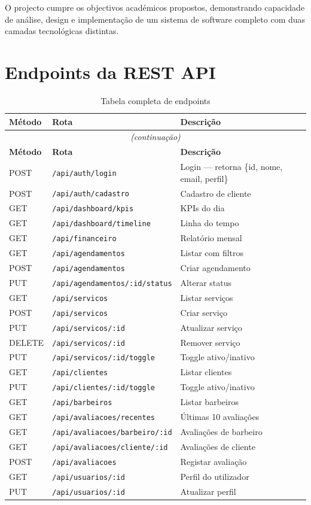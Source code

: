 \documentclass[12pt,a4paper]{article}
\begin{document}
O projecto cumpre os objectivos académicos propostos, demonstrando capacidade de análise, design e implementação de um sistema de software completo com duas camadas tecnológicas distintas.

\newpage
\appendix
\section{Endpoints da REST API}

\begin{longtable}{@{}llp{5.5cm}@{}}
\caption{Tabela completa de endpoints} \\
\toprule
\textbf{Método} & \textbf{Rota} & \textbf{Descrição} \\
\midrule
\endfirsthead
\multicolumn{3}{c}{\textit{(continuação)}} \\
\toprule
\textbf{Método} & \textbf{Rota} & \textbf{Descrição} \\
\midrule
\endhead
\bottomrule
\endfoot
POST & \texttt{/api/auth/login} & Login — retorna \{id, nome, email, perfil\} \\
POST & \texttt{/api/auth/cadastro} & Cadastro de cliente \\
GET  & \texttt{/api/dashboard/kpis} & KPIs do dia \\
GET  & \texttt{/api/dashboard/timeline} & Linha do tempo \\
GET  & \texttt{/api/financeiro} & Relatório mensal \\
GET  & \texttt{/api/agendamentos} & Listar com filtros \\
POST & \texttt{/api/agendamentos} & Criar agendamento \\
PUT  & \texttt{/api/agendamentos/:id/status} & Alterar status \\
GET  & \texttt{/api/servicos} & Listar serviços \\
POST & \texttt{/api/servicos} & Criar serviço \\
PUT  & \texttt{/api/servicos/:id} & Atualizar serviço \\
DELETE & \texttt{/api/servicos/:id} & Remover serviço \\
PUT  & \texttt{/api/servicos/:id/toggle} & Toggle ativo/inativo \\
GET  & \texttt{/api/clientes} & Listar clientes \\
PUT  & \texttt{/api/clientes/:id/toggle} & Toggle ativo/inativo \\
GET  & \texttt{/api/barbeiros} & Listar barbeiros \\
GET  & \texttt{/api/avaliacoes/recentes} & Últimas 10 avaliações \\
GET  & \texttt{/api/avaliacoes/barbeiro/:id} & Avaliações de barbeiro \\
GET  & \texttt{/api/avaliacoes/cliente/:id} & Avaliações de cliente \\
POST & \texttt{/api/avaliacoes} & Registar avaliação \\
GET  & \texttt{/api/usuarios/:id} & Perfil do utilizador \\
PUT  & \texttt{/api/usuarios/:id} & Atualizar perfil \\
\end{longtable}
\end{document}
